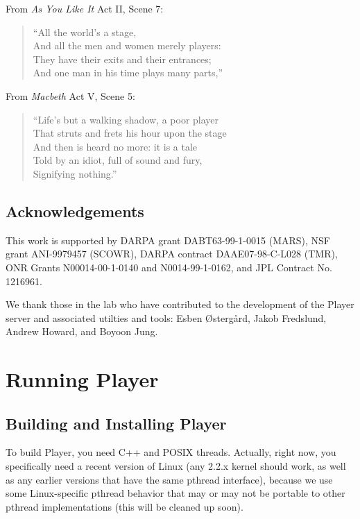 \documentclass[11pt]{article}
\begin{document}
\vspace*{1em}

From {\sl As You Like It} Act II, Scene 7:
\begin{quote}
  ``All the world's a stage, \\
  And all the men and women merely players: \\
  They have their exits and their entrances; \\
  And one man in his time plays many parts,''\\
\end{quote}

From {\sl Macbeth} Act V, Scene 5:
\begin{quote}
  ``Life's but a walking shadow, a poor player \\
  That struts and frets his hour upon the stage \\
  And then is heard no more: it is a tale \\
  Told by an idiot, full of sound and fury, \\
  Signifying nothing.''\\
\end{quote}

\subsection{Acknowledgements}
This work is supported by DARPA grant 
DABT63-99-1-0015 (MARS), NSF grant ANI-9979457 (SCOWR),
DARPA contract DAAE07-98-C-L028 (TMR),
ONR Grants N00014-00-1-0140 and N0014-99-1-0162,
and JPL Contract No. 1216961.

We thank those in the lab who have contributed to the development
of the Player server and associated utilties and tools: 
Esben \O{}sterg\aa{}rd, Jakob Fredslund, Andrew Howard, and Boyoon Jung.


\newpage
\section{Running Player}
\subsection{Building and Installing Player}
To build Player, you need C++ and POSIX threads.  Actually, right now,
you specifically need a recent version of Linux (any 2.2.x kernel should
work, as well as any earlier versions that have the same pthread interface),
because we use some Linux-specific pthread behavior that may or may not
be portable to other pthread implementations (this will be cleaned up 
soon).
\end{document}
